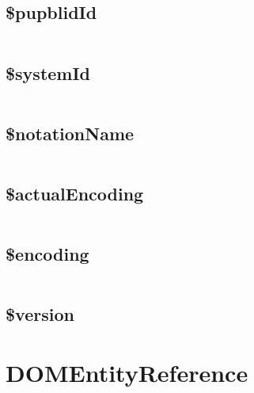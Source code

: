 \subsection{\$pupblidId}


\begin{lstlisting}[language=PHP]

\end{lstlisting}

\subsection{\$systemId}

\begin{lstlisting}[language=PHP]

\end{lstlisting}

\subsection{\$notationName}

\begin{lstlisting}[language=PHP]

\end{lstlisting}

\subsection{\$actualEncoding}


\begin{lstlisting}[language=PHP]

\end{lstlisting}

\subsection{\$encoding}


\begin{lstlisting}[language=PHP]

\end{lstlisting}


\subsection{\$version}


\section{DOMEntityReference}


